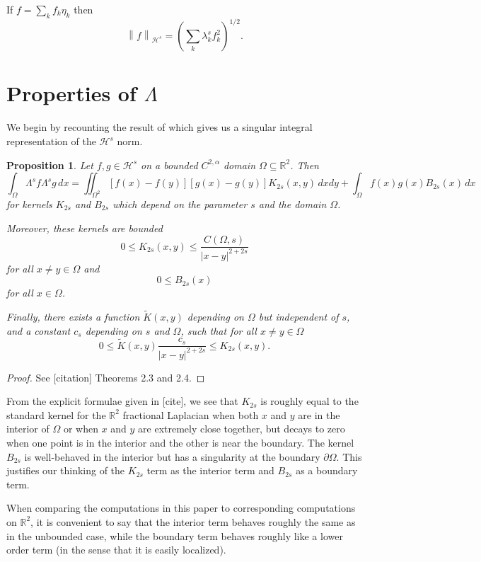 \documentclass[11pt]{amsart}
\newtheorem{proposition}[theorem]{Proposition}
\theoremstyle{remark}
\theoremstyle{definition}
\newcommand{\R}{\mathbb{R}}
\newcommand{\norm}[1]{\left\lVert#1\right\rVert}
\newcommand{\paren}[1]{\left( #1 \right)}
\newcommand{\del}{\partial}
\newcommand{\eigen}[1]{\eta_{#1}} %
\newcommand{\HD}{\mathcal{H}}
\begin{document}
If $f = \sum_k f_k \eigen{k}$ then
\[ \norm{f}_{\HD^s} = \paren{\sum_k \lambda_k^{s} f_k^2}^{1/2}. \]


\section{Properties of $\Lambda$} \label{sec:lemmas}

We begin by recounting the result of \cite{CaSt} which gives us a singular integral representation of the $\HD^s$ norm.  
\begin{proposition} \label{thm:Caff Stinga representation}
Let $f,g \in \HD^{s}$ on a bounded $C^{2,\alpha}$ domain $\Omega \subseteq \R^2$.  Then
\[ \int_\Omega \Lambda^s f \Lambda^s g \,dx = \iint_{\Omega^2} [f(x)-f(y)][g(x)-g(y)] K_{2s}(x,y) \,dxdy + \int_{\Omega} f(x) g(x) B_{2s}(x) \,dx \]
for kernels $K_{2s}$ and $B_{2s}$ which depend on the parameter $s$ and the domain $\Omega$.  

Moreover, these kernels are bounded
\[ 0 \leq K_{2s}(x,y) \leq \frac{C(\Omega,s)}{|x-y|^{2+2s}} \]
for all $x \neq y \in \Omega$ and
\[ 0 \leq B_{2s}(x) \]
for all $x \in \Omega$.  

Finally, there exists a function $\tilde{K}(x,y)$ depending on $\Omega$ but independent of $s$, and a constant $c_s$ depending on $s$ and $\Omega$, such that for all $x\neq y \in \Omega$
\[ 0 \leq \tilde{K}(x,y) \frac{c_s}{|x-y|^{2+2s}} \leq K_{2s}(x,y). \]
\end{proposition}

\begin{proof}
See [citation] Theorems 2.3 and 2.4.  
\end{proof}

From the explicit formulae given in [cite], we see that $K_{2s}$ is roughly equal to the standard kernel for the $\R^2$ fractional Laplacian when both $x$ and $y$ are in the interior of $\Omega$ or when $x$ and $y$ are extremely close together, but decays to zero when one point is in the interior and the other is near the boundary.  The kernel $B_{2s}$ is well-behaved in the interior but has a singularity at the boundary $\del \Omega$.  This justifies our thinking of the $K_{2s}$ term as the interior term and $B_{2s}$ as a boundary term.  

When comparing the computations in this paper to corresponding computations on $\R^2$, it is convenient to say that the interior term behaves roughly the same as in the unbounded case, while the boundary term behaves roughly like a lower order term (in the sense that it is easily localized).  
\end{document}
